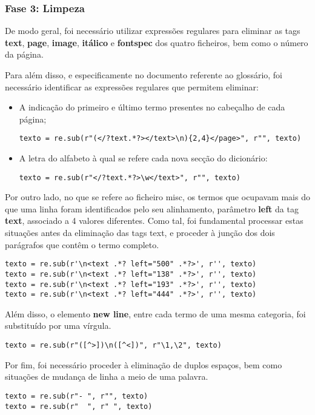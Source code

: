 \subsubsection{Fase 3: Limpeza}
De modo geral, foi necessário utilizar expressões regulares para eliminar as tags \textbf{text}, \textbf{page}, \textbf{image}, \textbf{itálico} e \textbf{fontspec} dos quatro ficheiros, bem como o número da página.

Para além disso, e especificamente no documento referente ao glossário, foi necessário identificar as expressões regulares que permitem eliminar:
\begin{itemize}
    \item A indicação do primeiro e último termo presentes no cabeçalho de cada página;
    \begin{lstlisting}[style=pythonstyle]
texto = re.sub(r"(</?text.*?></text>\n){2,4}</page>", r"", texto)
\end{lstlisting}
   
    \item A letra do alfabeto à qual se refere cada nova secção do dicionário:
   \begin{lstlisting}[style=pythonstyle]
texto = re.sub(r"</?text.*?>\w</text>", r"", texto)
\end{lstlisting}
\end{itemize}

Por outro lado, no que se refere ao ficheiro misc, os termos que ocupavam mais do que uma linha foram identificados pelo seu alinhamento, parâmetro \textbf{left} da tag \textbf{text}, associado a 4 valores diferentes. Como tal, foi fundamental processar estas situações antes da eliminação das tags text, e proceder à junção dos dois parágrafos que contêm o termo completo. 
\begin{lstlisting}[style=pythonstyle]
texto = re.sub(r'\n<text .*? left="500" .*?>', r'', texto)
texto = re.sub(r'\n<text .*? left="138" .*?>', r'', texto)
texto = re.sub(r'\n<text .*? left="193" .*?>', r'', texto)
texto = re.sub(r'\n<text .*? left="444" .*?>', r'', texto)
\end{lstlisting}

Além disso, o elemento \textbf{new line}, entre cada termo de uma mesma categoria, foi substituído por uma vírgula.
\begin{lstlisting}[style=pythonstyle]
texto = re.sub(r"([^>])\n([^<])", r"\1,\2", texto)
\end{lstlisting}

Por fim, foi necessário proceder à eliminação de duplos espaços, bem como situações de mudança de linha a meio de uma palavra.
\begin{lstlisting}[style=pythonstyle]
texto = re.sub(r"- ", r"", texto)
texto = re.sub(r"  ", r" ", texto)

\end{lstlisting}

